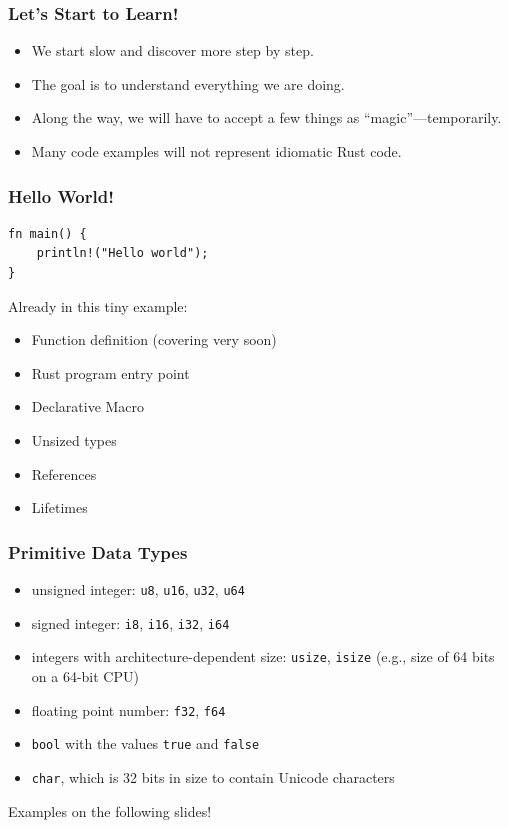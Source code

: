 \begin{frame}[fragile]
    \frametitle{Let's Start to Learn!}
    \begin{itemize}
        \item We start slow and discover more step by step.
        \item The goal is to understand everything we are doing.
        \pause
        \item Along the way, we will have to accept a few things as ``magic''---temporarily.
        \pause
        \item Many code examples will not represent idiomatic Rust code.
    \end{itemize}
\end{frame}

\begin{frame}[fragile]
    \frametitle{Hello World!}
    \begin{verbatim}
fn main() {
    println!("Hello world");
}
    \end{verbatim}
    \pause
    \vfill
    Already in this tiny example:
    \begin{itemize}
        \pause
        \item Function definition (covering very soon)
        \item Rust program entry point
        \pause
        \item Declarative Macro
        \pause
        \item Unsized types
        \item References
        \item Lifetimes
    \end{itemize}
\end{frame}

\begin{frame}[fragile]
    \frametitle{Primitive Data Types}
    \begin{itemize}
        \item unsigned integer: \texttt{u8}, \texttt{u16}, \texttt{u32}, \texttt{u64}
        \item signed integer: \texttt{i8}, \texttt{i16}, \texttt{i32}, \texttt{i64}
        \item integers with architecture-dependent size: \texttt{usize}, \texttt{isize} (e.g., size of 64 bits on a 64-bit CPU)
        \pause
        \item floating point number: \texttt{f32}, \texttt{f64}
        \item \texttt{bool} with the values \texttt{true} and \texttt{false}
        \item \texttt{char}, which is 32 bits in size to contain Unicode characters
    \end{itemize}
    \pause
    \vfill
    Examples on the following slides!
\end{frame}


